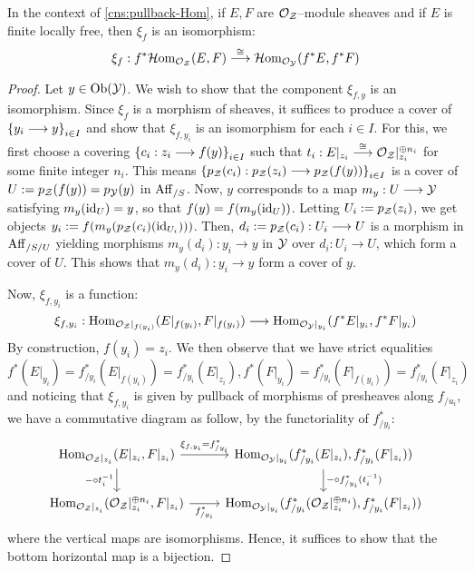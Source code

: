 \documentclass[11pt]{amsart}
\begin{document}
\begin{prop}\label{prop:pullback-Hom}
In the context of \cref{cns:pullback-Hom}, if $E, F$ are $\mathcal{O}_\mathcal{Z}$--module
sheaves and if $E$ is finite locally free, then $\xi_f$ is an isomorphism:
\[
\xi_f : f^*\HHom_{\mcO_\mcZ}(E, F) \to[\cong] \HHom_{\mcO_\mcY}(f^*E, f^*F)
\]
\end{prop}
\begin{proof}
Let $y \in \Ob{\mcY}$. We wish to show that the component $\xi_{f, y}$
is an isomorphism.
Since $\xi_f$ is a morphism of sheaves, it suffices to produce a cover of
$\set{y_i \to y}_{i \in I}$ and show that
$\xi_{f, y_i}$ is an isomorphism for each $i \in I$.
For this, we first choose a covering $\set{c_i : z_i \to f(y)}_{i \in I}$
such that $t_i : E|_{z_i} \to[\cong] \mcO_{\mcZ}|_{z_i}^{\oplus n_i}$ for
some finite integer $n_i$. This means
$\set{p_\mcZ(c_i) : p_\mcZ(z_i) \to p_\mcZ(f(y))}_{i \in I}$
is a cover of $U := p_\mathcal{Z}(f(y)) = p_\mathcal{Y}(y)$ in $\mathrm{Aff}_{/S}$.
Now, $y$ corresponds to a map $m_y : U \to \mcY$ satisfying $m_y(\mathrm{id}_U) = y$,
so that $f(y) = f(m_y(\mathrm{id}_U))$. Letting $U_i := p_\mathcal{Z}(z_i)$, we get objects
$y_i := f(m_y(p_\mathcal{Z}(c_i)(\mathrm{id}_{U_i})))$. Then,
$d_i := p_\mcZ(c_i) : U_i \to U$ is a morphism in $\mathrm{Aff}_{/S/U}$ yielding
morphisms $m_y(d_i) : y_i \to y$ in $\mathcal{Y}$ over $d_i : U_i \to U$, which form a
cover of $U$. This shows that $m_y(d_i) : y_i \to y$ form a cover of $y$.

Now, $\xi_{f, y_i}$ is a function:
\[
\xi_{f, y_i} : \Hom_{\mcO_\mcZ|_{f(y_i)}}(E|_{f(y_i)}, F|_{f(y_i)}) \to
\Hom_{\mcO_\mcY|_{y_i}}(f^*E|_{y_i}, f^*F|_{y_i})
\]
By construction, $f(y_i) = z_i$. We then observe that we have strict equalities
\[
f^*(E|_{y_i}) = f^*_{/y_i}(E|_{f(y_i)}) = f^*_{/y_i}(E|_{z_i}),
f^*(F|_{y_i}) = f^*_{/y_i}(F|_{f(y_i)}) = f^*_{/y_i}(F|_{z_i})
\]
and noticing that $\xi_{f, y_i}$ is given by pullback of morphisms of
presheaves along $f_{/u_i}$, we have a commutative diagram as follow, by
the functoriality of $f_{/y_i}^*$:
\[\begin{tikzcd}
\Hom_{\mcO_\mcZ|_{z_i}}(E|_{z_i}, F|_{z_i})
    \ar[r, "\xi_{f, y_i} = f_{/y_i}^*"]
    \ar[d, "- \circ t_i^{-1}" left] &
\Hom_{\mcO_\mcY|_{y_i}}(f^*_{/y_i}(E|_{z_i}), f_{/y_i}^*(F|_{z_i}))
    \ar[d, "- \circ f^*_{/y_i}(t_i^{-1})"] \\
\Hom_{\mcO_\mcZ|_{z_i}}(\mcO_\mcZ|_{z_i}^{\oplus n_i}, F|_{z_i})
    \ar[r, "f_{/y_i}^*" below] &
\Hom_{\mcO_\mcY|_{y_i}}(f^*_{/y_i}(\mcO_\mcZ|_{z_i}^{\oplus n_i}),
    f_{/y_i}^*(F|_{z_i}))
\end{tikzcd}\]
where the vertical maps are isomorphisms.
Hence, it suffices to show that the bottom horizontal map is a bijection.


\end{proof}
\end{document}

